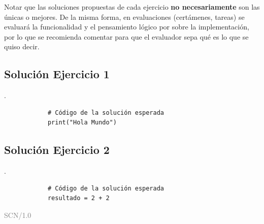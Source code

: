 \documentclass[11pt, a4paper]{article}
\begin{document}
	Notar que las soluciones propuestas de cada ejercicio \textbf{no necesariamente} son las únicas o mejores. De la misma forma, en evaluaciones (certámenes, tareas) se evaluará la funcionalidad y el pensamiento lógico por sobre la implementación, por lo que se recomienda comentar para que el evaluador sepa qué es lo que se quiso decir.
	
	\subsection*{Solución Ejercicio 1}
	\begin{solucion}
		.
		
		\begin{lstlisting}
			# Código de la solución esperada
			print("Hola Mundo")
		\end{lstlisting}
	\end{solucion}
	
	\subsection*{Solución Ejercicio 2}
	\begin{solucion}
		.
		
		\begin{lstlisting}
			# Código de la solución esperada
			resultado = 2 + 2
		\end{lstlisting}
	\end{solucion}
	
	\vfill
	\hfill \textcolor{gray}{SCN/1.0}
	
\end{document}
